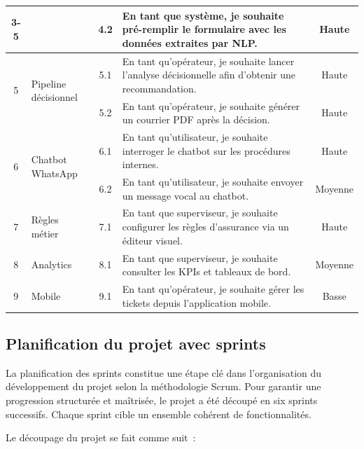 \begin{longtable}{|c|p{2.5cm}|c|p{5.8cm}|c|}
\cline{3-5}
 & & 4.2 & En tant que syst\`{e}me, je souhaite pr\'{e}-remplir le formulaire avec les donn\'{e}es extraites par NLP. & Haute \\
\hline
\multirow{2}{*}{5} & \multirow{2}{2.8cm}{Pipeline d\'{e}cisionnel} & 5.1 & En tant qu'op\'{e}rateur, je souhaite lancer l'analyse d\'{e}cisionnelle afin d'obtenir une recommandation. & Haute \\
\cline{3-5}
 & & 5.2 & En tant qu'op\'{e}rateur, je souhaite g\'{e}n\'{e}rer un courrier PDF apr\`{e}s la d\'{e}cision. & Haute \\
\hline
\multirow{2}{*}{6} & \multirow{2}{2.8cm}{Chatbot WhatsApp} & 6.1 & En tant qu'utilisateur, je souhaite interroger le chatbot sur les proc\'{e}dures internes. & Haute \\
\cline{3-5}
 & & 6.2 & En tant qu'utilisateur, je souhaite envoyer un message vocal au chatbot. & Moyenne \\
\hline
7 & R\`{e}gles m\'{e}tier & 7.1 & En tant que superviseur, je souhaite configurer les r\`{e}gles d'assurance via un \'{e}diteur visuel. & Haute \\
\hline
8 & Analytics & 8.1 & En tant que superviseur, je souhaite consulter les KPIs et tableaux de bord. & Moyenne \\
\hline
9 & Mobile & 9.1 & En tant qu'op\'{e}rateur, je souhaite g\'{e}rer les tickets depuis l'application mobile. & Basse \\
\hline
\end{longtable}

\subsection{Planification du projet avec sprints}

La planification des sprints constitue une \'{e}tape cl\'{e} dans l'organisation du d\'{e}veloppement du projet selon la m\'{e}thodologie Scrum. Pour garantir une progression structur\'{e}e et ma\^{i}tris\'{e}e, le projet a \'{e}t\'{e} d\'{e}coup\'{e} en six sprints successifs. Chaque sprint cible un ensemble coh\'{e}rent de fonctionnalit\'{e}s.

\indent Le d\'{e}coupage du projet se fait comme suit~:

